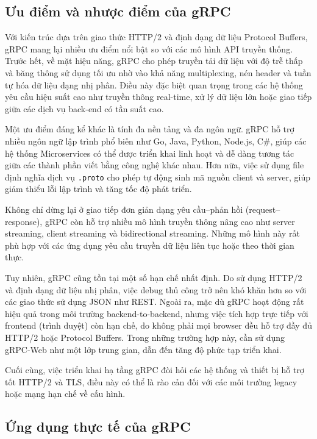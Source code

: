 \documentclass{uetgraduation}
\begin{document}
\subsection{Ưu điểm và nhược điểm của gRPC}

Với kiến trúc dựa trên giao thức HTTP/2 và định dạng dữ liệu Protocol Buffers, gRPC mang lại nhiều ưu điểm nổi bật so với các mô hình API truyền thống. Trước hết, về mặt hiệu năng, gRPC cho phép truyền tải dữ liệu với độ trễ thấp và băng thông sử dụng tối ưu nhờ vào khả năng multiplexing, nén header và tuần tự hóa dữ liệu dạng nhị phân. Điều này đặc biệt quan trọng trong các hệ thống yêu cầu hiệu suất cao như truyền thông real-time, xử lý dữ liệu lớn hoặc giao tiếp giữa các dịch vụ back-end có tần suất cao.

Một ưu điểm đáng kể khác là tính đa nền tảng và đa ngôn ngữ. gRPC hỗ trợ nhiều ngôn ngữ lập trình phổ biến như Go, Java, Python, Node.js, C\#, giúp các hệ thống Microservices có thể được triển khai linh hoạt và dễ dàng tương tác giữa các thành phần viết bằng công nghệ khác nhau. Hơn nữa, việc sử dụng file định nghĩa dịch vụ \texttt{.proto} cho phép tự động sinh mã nguồn client và server, giúp giảm thiểu lỗi lập trình và tăng tốc độ phát triển.

Không chỉ dừng lại ở giao tiếp đơn giản dạng yêu cầu–phản hồi (request–response), gRPC còn hỗ trợ nhiều mô hình truyền thông nâng cao như server streaming, client streaming và bidirectional streaming. Những mô hình này rất phù hợp với các ứng dụng yêu cầu truyền dữ liệu liên tục hoặc theo thời gian thực.

Tuy nhiên, gRPC cũng tồn tại một số hạn chế nhất định. Do sử dụng HTTP/2 và định dạng dữ liệu nhị phân, việc debug thủ công trở nên khó khăn hơn so với các giao thức sử dụng JSON như REST. Ngoài ra, mặc dù gRPC hoạt động rất hiệu quả trong môi trường backend-to-backend, nhưng việc tích hợp trực tiếp với frontend (trình duyệt) còn hạn chế, do không phải mọi browser đều hỗ trợ đầy đủ HTTP/2 hoặc Protocol Buffers. Trong những trường hợp này, cần sử dụng gRPC-Web như một lớp trung gian, dẫn đến tăng độ phức tạp triển khai.

Cuối cùng, việc triển khai hạ tầng gRPC đòi hỏi các hệ thống và thiết bị hỗ trợ tốt HTTP/2 và TLS, điều này có thể là rào cản đối với các môi trường legacy hoặc mạng hạn chế về cấu hình.

\subsection{Ứng dụng thực tế của gRPC}
\end{document}
